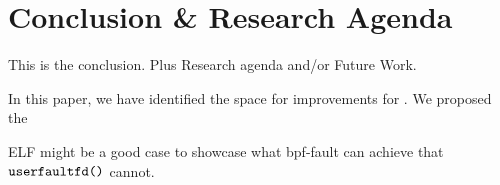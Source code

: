 \section{Conclusion \& Research Agenda}
\label{sec:conclusion}

This is the conclusion. Plus Research agenda and/or Future Work.

In this paper, we have identified the space for improvements for \uffd. We proposed the 

ELF might be a good case to showcase what bpf-fault can achieve that $\texttt{userfaultfd()}$  cannot.